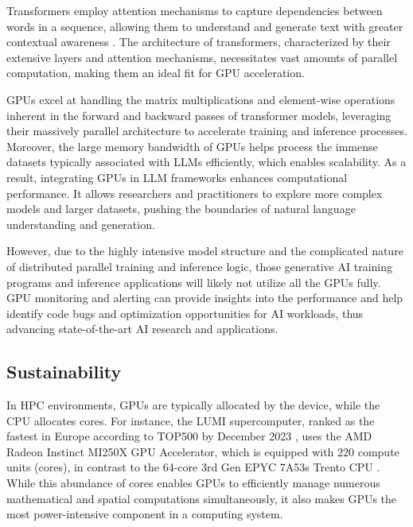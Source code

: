 
Transformers employ attention mechanisms to capture dependencies between words in a sequence, allowing them to understand and generate text with greater contextual awareness \cite{NIPS2017_3f5ee243}. The architecture of transformers, characterized by their extensive layers and attention mechanisms, necessitates vast amounts of parallel computation, making them an ideal fit for GPU acceleration.

GPUs excel at handling the matrix multiplications and element-wise operations inherent in the forward and backward passes of transformer models, leveraging their massively parallel architecture to accelerate training and inference processes. Moreover, the large memory bandwidth of GPUs helps process the immense datasets typically associated with LLMs efficiently, which enables scalability. As a result, integrating GPUs in LLM frameworks enhances computational performance. It allows researchers and practitioners to explore more complex models and larger datasets, pushing the boundaries of natural language understanding and generation. 

However, due to the highly intensive model structure and the complicated nature of distributed parallel training and inference logic, those generative AI training programs and inference applications will likely not utilize all the GPUs fully. GPU monitoring and alerting can provide insights into the performance and help identify code bugs and optimization opportunities for AI workloads, thus advancing state-of-the-art AI research and applications.

\subsection{Sustainability}

In HPC environments, GPUs are typically allocated by the device, while the CPU allocates cores. For instance, the LUMI supercomputer, ranked as the fastest in Europe according to TOP500 by December 2023 \cite{TOP500}, uses the AMD Radeon Instinct MI250X GPU Accelerator, which is equipped with 220 compute units (cores), in contrast to the 64-core 3rd Gen EPYC 7A53s Trento CPU \cite{lumi}. While this abundance of cores enables GPUs to efficiently manage numerous mathematical and spatial computations simultaneously, it also makes GPUs the most power-intensive component in a computing system.

